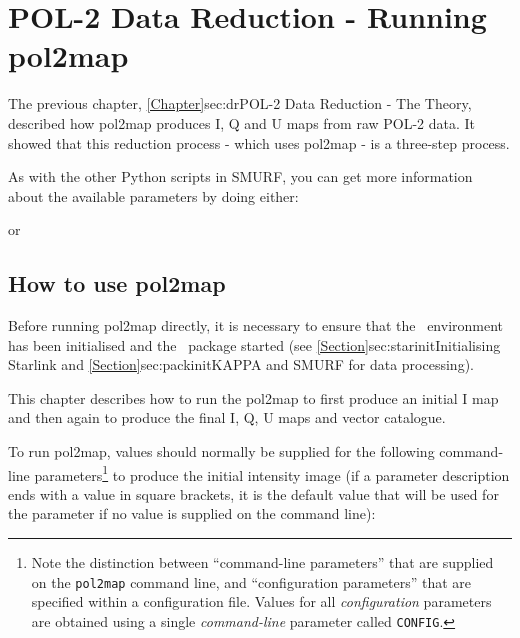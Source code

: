 \chapter{POL-2 Data Reduction - Running
  pol2map}
\label{sec:rundr}

The previous chapter, \cref{Chapter}{sec:dr}{POL-2 Data Reduction -
  The Theory}, described how pol2map produces I, Q and U maps from raw
POL-2 data.  It showed that this reduction process - which uses
pol2map - is a three-step process.

As with the other Python scripts in SMURF, you can get more
information about the available parameters by doing either:
\begin{terminalv}
\end{terminalv}
or
\begin{terminalv}
\end{terminalv}

\section{How to use pol2map}

Before running pol2map directly, it is necessary to ensure that
the \starlink\ environment has been initialised and the \smurf\
package started (see \cref{Section}{sec:starinit}{Initialising
  Starlink} and \cref{Section}{sec:packinit}{KAPPA and SMURF for data
  processing}).

This chapter describes how to run the pol2map to first produce an
initial I map and then again to produce the final I, Q, U maps and
vector catalogue.

To run pol2map, values should normally be supplied for the following
command-line parameters\footnote{Note the distinction between
  ``command-line parameters'' that are supplied on the
  \texttt{pol2map} command line, and ``configuration parameters'' that
  are specified within a configuration file. Values for all
  \emph{configuration} parameters are obtained using a single
  \emph{command-line} parameter called \texttt{CONFIG}.} to produce
the initial intensity image (if a parameter description ends with a value
in square brackets, it is the default value that will be used for
the parameter if no value is supplied on the command line):

